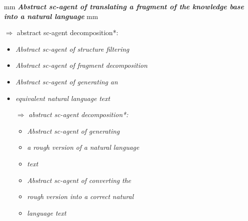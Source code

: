 \documentclass[9pt, a4paper]{article}
\begin{document}
\begin{minipage}{0.46\textwidth}
 mm
\textit{\textbf{Abstract sc-agent of translating a fragment of the
knowledge base into a natural language}}
 mm


 \hspace {-3 mm}
 $\Longrightarrow$ abstract sc-agent decomposition*:
\renewcommand{\labelitemi}{$\{\bullet$}
\begin{itemize}
 mm
  \item \textit{Abstract sc-agent of structure filtering}
  \renewcommand{\labelitemi}{$\bullet$}
  \item \textit{Abstract sc-agent of fragment
decomposition}
    \item \textit{Abstract sc-agent of generating an }
    \renewcommand{\labelitemi}{}
    \item \textit{equivalent natural language text}


 \hspace {2 mm}
 \textit{$\Longrightarrow$  abstract sc-agent decomposition*:}
\renewcommand{\labelitemii}{$\{\bullet$}
\begin{itemize}
 mm
\item \textit{Abstract sc-agent of
generating}
\renewcommand{\labelitemii}{}
\item \textit{a rough version of a natural language}
\item \textit{text}
\renewcommand{\labelitemii}{$\bullet$}
\item \textit{Abstract sc-agent of converting the }
\renewcommand{\labelitemii}{}
\item \textit{rough version into a correct natural}
\item \textit{language text}
\end{itemize}
\end{itemize}
\end{minipage}
\end{document}
